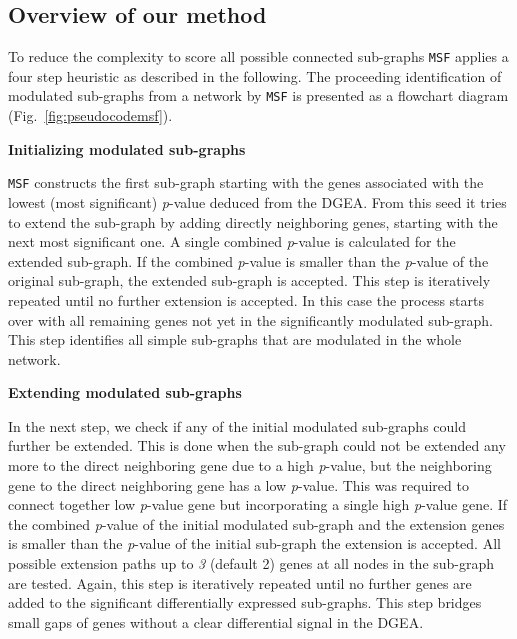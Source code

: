 \documentclass[10pt,a4paper,twocolumn]{article}
\begin{document}
	\subsection*{Overview of our method}
	
	To reduce the complexity to score all possible connected sub-graphs
	\texttt{MSF} applies a four step heuristic as described in the
	following. The proceeding identification of modulated sub-graphs from a
	network by \texttt{MSF} is presented as a flowchart diagram
	(Fig.~\ref{fig:pseudocodemsf}). \newline
	
	
	
	\textbf{Initializing modulated sub-graphs}
	
	\texttt{MSF} constructs the first sub-graph starting with the genes
	associated with the lowest (most significant) \textit{p}-value deduced from
	the DGEA. From this seed it tries to extend the sub-graph by adding directly
	neighboring genes, starting with the next most significant one. A single
	combined \textit{p}-value is calculated for the extended sub-graph.
	If the combined \textit{p}-value is smaller than the \textit{p}-value of
	the original sub-graph,
	the extended sub-graph is accepted. This step is
	iteratively repeated until no further extension is accepted. In this case
	the process starts over with all remaining genes not yet in the significantly
	modulated sub-graph. This step identifies all simple sub-graphs that
	are modulated in the whole network.\newline
	
	\textbf{Extending modulated sub-graphs}
	
	In the next step, we check if any of the initial modulated sub-graphs 
	could further be extended. This is done when the sub-graph could not be extended any more to the direct neighboring gene due to a high \textit{p}-value, but the neighboring gene to the direct neighboring gene has a low \textit{p}-value. This was required to connect together low \textit{p}-value gene but incorporating a single high \textit{p}-value gene. If the combined \textit{p}-value of the initial modulated sub-graph and the extension genes is smaller than the \textit{p}-value of the initial sub-graph the extension is accepted. All possible extension paths up to \emph{3} (default 2) genes at
	all nodes in the sub-graph are tested. Again, this step is iteratively repeated until
	no further genes are added to the significant differentially expressed
	sub-graphs. This step bridges small gaps of genes without a clear
	differential signal in the DGEA.\newline
	
\end{document}
